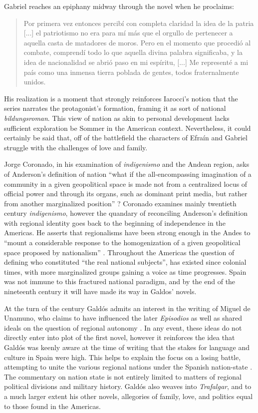 \documentclass[12pt]{report}
\begin{document}
Gabriel reaches an epiphany midway through the novel when he proclaims:
\blockquote[{\cite[1127]{Galdos1882}}]{Por primera vez entonces percibí con completa claridad la idea de la patria [...] el patriotismo no era para mí más que el orgullo de pertenecer a aquella casta de matadores de moros. Pero en el momento que procedió al combate, comprendí todo lo que aquella divina palabra significaba, y la idea de nacionalidad se abrió paso en mi espíritu, [...] Me representé a mi país como una inmensa tierra poblada de gentes, todos fraternalmente unidos.}
His realization is a moment that strongly reinforces Iarocci's notion that the series narrates the protagonist's formation, framing it as sort of national \textit{bildungsroman}.
This view of nation as akin to personal development lacks sufficient exploration be Sommer in the American context.
Nevertheless, it could certainly be said that, off of the battlefield the characters of Efraín and Gabriel struggle with the challenges of love and family.

Jorge Coronado, in his examination of \textit{indigenismo} and the Andean region, asks of Anderson's definition of nation \enquote{what if the all-encompassing imagination of a community in a given geopolitical space is made not from a centralized locus of official power and through its organs, such as dominant print media, but rather from another marginalized position} \cite[12]{Coronado2009}?
Coronado examines mainly twentieth century \textit{indigenismo}, however the quandary of reconciling Anderson's definition with regional identity goes back to the beginning of independence in the Americas.
He asserts that regionalisms have been strong enough in the Andes to \enquote{mount a considerable response to the homogenization of a given geopolitical space proposed by nationalism} \cite[12]{Coronado2009}.
Throughout the Americas the question of defining who constituted \enquote{the real national subjects}, has existed since colonial times, with more marginalized groups gaining a voice as time progresses.
Spain was not immune to this fractured national paradigm, and by the end of the nineteenth century it will have made its way in Galdos' novels.

At the turn of the century Galdós admits an interest in the writing of Miguel de Unamuno, who claims to have influenced the later \textit{Episodios} as well as shared ideals on the question of regional autonomy \cite[291]{Kempen2007}.
In any event, these ideas do not directly enter into plot of the first novel, however it reinforces the idea that Galdós was keenly aware at the time of writing that the stakes for language and culture in Spain were high.
This helps to explain the focus on a losing battle, attempting to unite the various regional nations under the Spanish nation-state \cite{Kempen2007}.
The commentary on nation state is not entirely limited to matters of regional political divisions and military history.
Galdós also weaves into \textit{Trafalgar}, and to a much larger extent his other novels, allegories of family, love, and politics equal to those found in the Americas.
\end{document}
